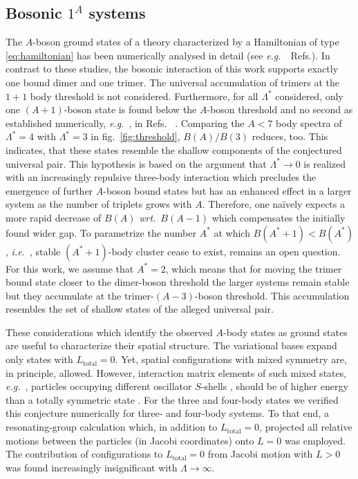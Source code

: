 \documentclass[preprint,12pt]{elsarticle}
\newcommand{\es}{1\text{\scriptsize s}}
\newcommand{\zs}{2\text{\scriptsize s}}
\newcommand{\wrt}{\textit{wrt.}~}
\newcommand{\eg}{\textit{e.g.}~}
\newcommand{\ie}{\textit{i.e.}~}
\newcommand{\figref}[1]{fig.~\ref{#1}}
\begin{document}
\subsection{Bosonic $1^{A}$ systems}
The $A$-boson ground states of a theory characterized by a Hamiltonian of
type \eqref{eq:hamiltonian}
has been numerically analysed in detail (see \eg~Refs.\cite{Bazak:2016wxm,2015PhRvA..92c3626Y,Gattobigio:2012tk,vonStecher:2011zz,Gattobigio:2011ey}).
In contrast to these studies, the bosonic interaction of this work supports
exactly one bound dimer and one trimer. The universal accumulation of trimers
at the $1+1$ body threshold is not considered. Furthermore, for all $\Lambda^*$
considered, only one $(A+1)$-boson state is found below
the $A$-boson threshold and no second as established numerically, \eg, in Refs.~
\cite{Hammer:2006ct,2009NatPh...5..417V,vonStecher:2011zz}.
Comparing the $A<7$ body spectra of $\Lambda^*=4$ with $\Lambda^*=3$ in
\figref{fig:threshold}, $B(A)/B(3)$ reduces, too. This indicates, that these states
resemble the shallow components of the conjectured universal pair. This hypothesis is
based on the argument that $\Lambda^*\to0$ is realized with an increasingly repulsive
three-body interaction which precludes the emergence of further $A$-boson bound states
but has an enhanced effect in a larger system as the number of triplets grows
with $A$. Therefore, one na\"ively expects a more rapid decrease of $B(A)$ \wrt $B(A-1)$ which compensates the initially found wider gap. To parametrize the
number $A^*$ at which $B(A^*+1)<B(A^*)$, \ie, stable $(A^*+1)$-body
cluster cease to exist, remains an open question.
For this work, we assume that $A^*=2$, which
means that for moving the trimer bound state closer to the dimer-boson threshold
the larger systems remain stable but they accumulate at the trimer-$(A-3)$-boson
threshold. This accumulation resembles the set of shallow states of the
alleged universal pair.

These considerations which identify the observed $A$-body states as ground
states are useful to characterize their spatial structure. The variational
bases expand only states with $L_\text{total}=0$. Yet, spatial configurations with
mixed symmetry are, in principle, allowed. However, interaction matrix elements
of such mixed states, \eg, particles occupying different oscillator $S$-shells
\scalebox{0.8}{$\young(\es,\zs)$}, 
should be of higher energy than a totally symmetric state
\scalebox{0.8}{$\young(\es\es)$}. For the three and four-body states we verified
this conjecture numerically for three- and four-body systems. To that end, a
resonating-group calculation which, in addition to $L_\text{total}=0$, projected
all relative motions between the particles (in Jacobi coordinates) onto $L=0$ was
employed. The contribution of configurations to $L_\text{total}=0$ from
Jacobi motion with $L>0$ was found increasingly insignificant with $\Lambda\to\infty$.
\end{document}
